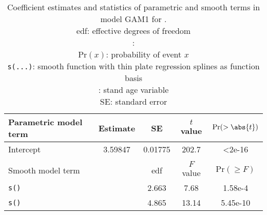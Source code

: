 \begin{singlespace}
  \begin{table}[h]
    \caption{Coefficient estimates and statistics of parametric and smooth terms in model GAM1 for \Beech{}. \\
      edf: effective degrees of freedom \\
      \texttt{\ProductivityIndexVariableR{}}: \ProductivityIndexVariableText{} \\
      \(\text{Pr}(x)\): probability of event \(x\) \\
      \texttt{s(...)}: smooth function with thin plate regression splines as function basis \\
      \texttt{\StandAgeVariableR{}}: stand age variable \\
      SE: standard error}
    \label{tab:StatisticsGAM1Beech}
    {\tabulinesep=2mm
      \begin{tabu}{L
          S[table-format = 1.5]
          S[table-format = 1.5]
          S[table-format = 3.2]
          S[table-format = 1.2e-2, table-comparator = true]
        }
        \toprule
        Parametric model term & {Estimate} & {SE} & {\(t\) value} & {\(\text{Pr}(> \abs{t})\)} \\
        \midrule
        Intercept & 3.59847 & 0.01775 & 202.7 & <2e-16 \\
        \\
        Smooth model term &  & {edf} & {\(F\) value} & {\(\text{Pr}(\geq F)\)} \\
        \midrule
        \texttt{s(\StandAgeVariableR{})} & & 2.663 & 7.68 & 1.58e-4 \\
        \texttt{s(\ProductivityIndexVariableR{})} & & 4.865 & 13.14 & 5.45e-10 \\
        \bottomrule
      \end{tabu}
    }
  \end{table}
\end{singlespace}

